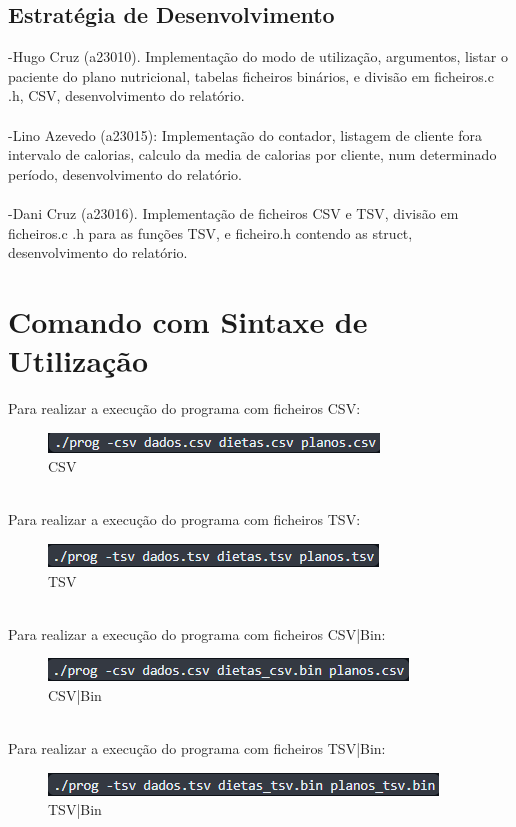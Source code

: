 \documentclass[a4wide]{report}
\begin{document}
\section{Estratégia de Desenvolvimento}
-Hugo Cruz (a23010). Implementação do modo de utilização, argumentos, listar o paciente do plano nutricional, tabelas ficheiros binários, e divisão em ficheiros.c .h, CSV, desenvolvimento do relatório.
\\
\\
-Lino Azevedo (a23015): Implementação do contador, listagem de cliente fora intervalo de calorias, calculo da media de calorias por cliente, num determinado período, desenvolvimento do relatório.
\\
\\
-Dani Cruz (a23016). Implementação de ficheiros CSV e TSV, divisão em ficheiros.c .h para as funções TSV, e ficheiro.h contendo as struct, desenvolvimento do relatório.
\\
\chapter{Comando com Sintaxe de Utilização}
Para realizar a execução do programa com ficheiros CSV:
\begin{figure}[h!]
\centering
    \includegraphics[width=0.5\linewidth]{csvexe.png}
    \caption{CSV}
    \label{fig:divisao-csv}
\end{figure}
\\
Para realizar a execução do programa com ficheiros TSV:
\begin{figure}[h!]
\centering
    \includegraphics[width=0.5\linewidth]{tsvexe.png}
    \caption{TSV}
    \label{fig:divisao-tsv}
\end{figure}
\\
Para realizar a execução do programa com ficheiros CSV|Bin:
\begin{figure}[h!]
\centering
    \includegraphics[width=0.5\linewidth]{csvbinexe.png}
    \caption{CSV|Bin}
    \label{fig:divisao-csv-bin}
\end{figure}
\\
Para realizar a execução do programa com ficheiros TSV|Bin:
\begin{figure}[h!]
\centering
    \includegraphics[width=0.5\linewidth]{tsvbinexe.png}
    \caption{TSV|Bin}
    \label{fig:divisao-tsv-bin}
\end{figure}
\\
\end{document}

